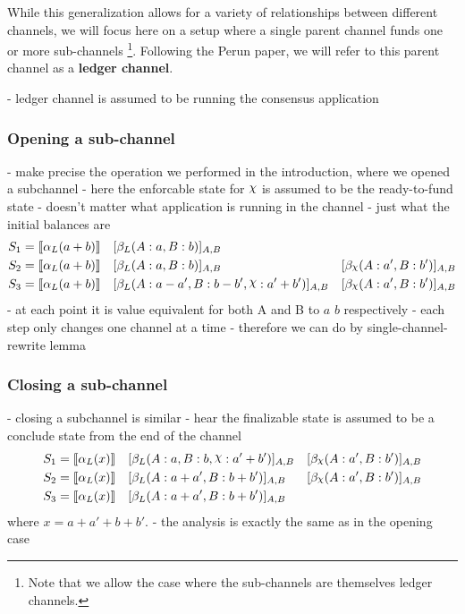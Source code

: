 \documentclass{article}
\DeclareRobustCommand{\rchi}{{\mathpalette\irchi\relax}}
\newcommand{\irchi}[2]{\raisebox{\depth}{$#1\chi$}} %
\theoremstyle{definition}
\newcommand{\adj}[1]{\llbracket #1 \rrbracket}
\newcommand{\enf}[1]{[#1]}
\begin{document}
While this generalization allows for a variety of relationships between different channels,
we will focus here on a setup where a single parent channel funds one or more sub-channels
\footnote{Note that we allow the case where the sub-channels are themselves ledger channels.}.
Following the Perun paper, we will refer to this parent channel as a \textbf{ledger channel}.

- ledger channel is assumed to be running the consensus application

\subsubsection{Opening a sub-channel}

- make precise the operation we performed in the introduction, where we opened a subchannel
- here the enforcable state for $\rchi$ is assumed to be the ready-to-fund state
- doesn't matter what application is running in the channel - just what the initial balances are
\begin{align*}
  S_1 &= \adj{\alpha_L(a+b)} &&\enf{\beta_L(A: a, B: b)}_{A, B} & \\
  S_2 &= \adj{\alpha_L(a+b)} &&\enf{\beta_L(A: a, B: b)}_{A, B}&\enf{\beta_\rchi(A: a', B: b')}_{A, B} \\
  S_3 &= \adj{\alpha_L(a+b)} &&\enf{\beta_L(A: a-a', B: b-b', \rchi: a' + b')}_{A, B}&\enf{\beta_\rchi(A: a', B: b')}_{A, B}
\end{align*}
- at each point it is value equivalent for both A and B to $a$ $b$ respectively
- each step only changes one channel at a time 
- therefore we can do by single-channel-rewrite lemma

\subsubsection{Closing a sub-channel}

- closing a subchannel is similar
- hear the finalizable state is assumed to be a conclude state from the end of the channel
\begin{align*}
S_1 &= \adj{\alpha_L(x)} &&\enf{\beta_L(A: a, B: b, \rchi: a' + b')}_{A, B}&\enf{\beta_\rchi(A: a', B: b')}_{A, B}\\
S_2 &= \adj{\alpha_L(x)} &&\enf{\beta_L(A: a + a', B: b + b')}_{A, B}&\enf{\beta_\rchi(A: a', B: b')}_{A, B} \\
S_3 &= \adj{\alpha_L(x)} &&\enf{\beta_L(A: a + a', B: b + b')}_{A, B} & 
\end{align*}
where $x = a + a' + b + b'$.
- the analysis is exactly the same as in the opening case
\end{document}
